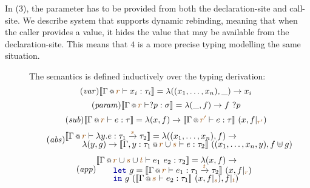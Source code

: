 In ($3$), the parameter  has to be provided from both the declaration-site and call-site.
We describe system that supports dynamic rebinding, meaning that when the caller provides a 
value, it hides the value that may be available from the declaration-site. This means that 
$4$ is a more precise typing modelling the same situation. 


\begin{figure}

{\small The semantics is defined inductively over the typing derivation:}
\begin{equation}
\tag{\emph{var}}
\sem{\coctx{\Gamma}{\aclrd{r}} \vdash x_i : \tau_i} = \lambda ((x_1, \ldots, x_n), \_) \rightarrow x_i
\end{equation}
\vspace{-1.5em}
\begin{equation}
\tag{\emph{param}}
\sem{\coctx{\Gamma}{\aclrd{r}} \vdash ?p : \sigma} = \lambda (\_, f) \rightarrow f~?p
\end{equation}
\vspace{-1.5em}
\begin{equation}
\tag{\emph{sub}}
\sem{\coctx{\Gamma}{\aclrd{r}} \vdash e : \tau} = \lambda (x, f) \rightarrow 
  \sem{\coctx{\Gamma}{\aclrd{r'}} \vdash e : \tau}~(x, \restr{f}{\aclrd{r'}})
\end{equation}
\vspace{-1.5em}
\begin{equation}
\tag{\emph{abs}}
\hspace{-0.5em}
\begin{array}{l}
  \sem{\coctx{\Gamma}{\aclrd{r}} \vdash \lambda y. e : \tau_1 \xrightarrow{\aclrd{s}} \tau_2 } = \lambda ((x_1, \ldots, x_n), f) \rightarrow\\[-0.25em]
  \qquad\lambda (y, g) \rightarrow \sem{ \coctx{\Gamma,y:\tau_1}{\aclrd{r}\cup\aclrd{s}} \vdash e : \tau_2 }~((x_1, \ldots, x_n, y), f \uplus g)   	 
\end{array}
\end{equation}
\vspace{-1.0em}
\begin{equation*}
\tag{\emph{app}}
\hspace{-0.5em}
\begin{array}{l}
  \sem{\coctx{\Gamma}{\aclrd{r}\cup\aclrd{s}\cup\aclrd{t}} \vdash e_1~e_2 : \tau_2 } = \lambda (x, f) \rightarrow \\[-0.25em]
  \qquad\kvd{let}~g=\sem{ \coctx{\Gamma}{\aclrd{r}} \vdash e_1 : \tau_1 \xrightarrow{\aclrd{t}} \tau_2 }~(x, \restr{f}{\aclrd{r}})\\[-0.25em]
  \qquad\kvd{in}~g~(\sem{ \coctx{\Gamma}{\aclrd{s}} \vdash e_2 : \tau_1 }~(x, \restr{f}{\aclrd{s}} ), \restr{f}{\aclrd{t}})
\end{array}
\end{equation*}


\end{figure}
